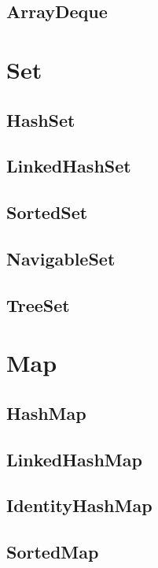 \documentclass[14pt,fleqn]{extbook} %
\begin{document}
\subsection{ArrayDeque}

\section{Set}

\subsection{HashSet}

\subsection{LinkedHashSet}

\subsection{SortedSet}

\subsection{NavigableSet}

\subsection{TreeSet}

\section{Map}

\subsection{HashMap}

\subsection{LinkedHashMap}

\subsection{IdentityHashMap}

\subsection{SortedMap}

\end{document}
